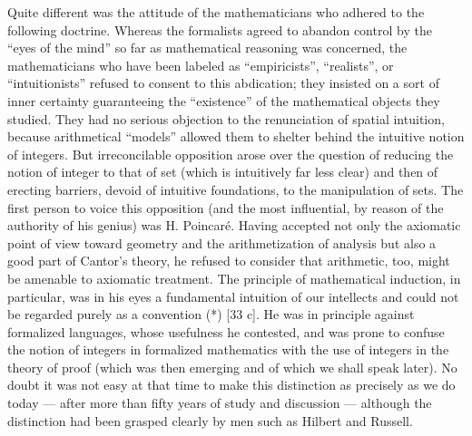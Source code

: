 Quite different was the attitude of the mathematicians who adhered to the following doctrine. Whereas the formalists agreed to abandon control by the ``eyes of the mind'' so far as mathematical reasoning was concerned, the mathematicians who have been labeled as ``empiricists'', ``realists'', or ``intuitionists'' refused to consent to this abdication; they insisted on a sort of inner certainty guaranteeing the ``existence'' of the mathematical objects they studied. They had no serious objection to the renunciation of spatial intuition, because arithmetical ``models'' allowed them to shelter behind the intuitive notion of integers. But irreconcilable opposition arose over the question of reducing the notion of integer to that of set (which is intuitively far less clear) and then of erecting barriers, devoid of intuitive foundations, to the manipulation of sets. The first person to voice this opposition (and the most influential, by reason of the authority of his genius) was H. Poincaré. Having accepted not only the axiomatic point of view toward geometry and the arithmetization of analysis but also a good part of Cantor's theory, he refused to consider that arithmetic, too, might be amenable to axiomatic treatment. The principle of mathematical induction, in particular, was in his eyes a fundamental intuition of our intellects and could not be regarded purely as a convention (*) {[}33 c{]}. He was in principle against formalized languages, whose usefulness he contested, and was prone to confuse the notion of integers in formalized mathematics with the use of integers in the theory of proof (which was then emerging and of which we shall speak later). No doubt it was not easy at that time to make this distinction as precisely as we do today --- after more than fifty years of study and discussion --- although the distinction had been grasped clearly by men such as Hilbert and Russell.

